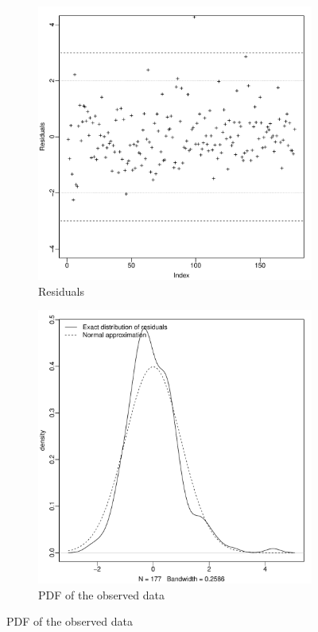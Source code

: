 \documentclass[12pt,a4paper,twoside]{article}
\begin{document}
\begin{figure}[!ht]
    \begin{subfigure}{0.5\textwidth}
        \centering
        \includegraphics[width=\textwidth]{img/KARMA-residuals.pdf}
        \caption{Residuals}
        \label{fig:KARMAresiduals}
    \end{subfigure}
    \begin{subfigure}{0.5\textwidth}
        \centering
        \includegraphics[width=\textwidth]{img/KARMA-density.pdf}
        \caption{PDF of the observed data}
        \label{fig:KARMAdensity}
    \end{subfigure}
\end{figure}
\end{document}
